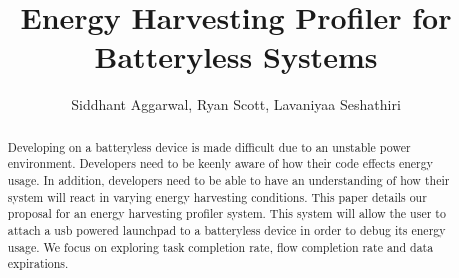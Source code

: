 \documentclass[10pt, sigconf ]{acmart}
\title{Energy Harvesting Profiler for Batteryless Systems}
\author{Siddhant Aggarwal, Ryan Scott, Lavaniyaa Seshathiri}
\begin{document}
\begin{abstract}
 Developing on a batteryless device is made difficult due to an unstable power environment.
 Developers need to be keenly aware of how their code effects energy usage.
 In addition, developers need to be able to have an understanding of how their system will react in varying energy harvesting conditions.
 This paper details our proposal for an energy harvesting profiler system.
 This system will allow the user to attach a usb powered launchpad to a batteryless device in order to debug its energy usage.
 We focus on exploring task completion rate, flow completion rate and data expirations.
 

\end{abstract}

\maketitle




%




\end{document}
